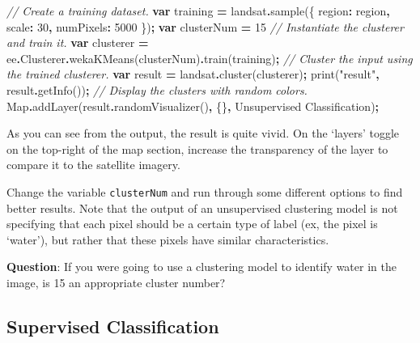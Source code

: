 \documentclass[
]{article}
\newenvironment{Shaded}{\begin{snugshade}}{\end{snugshade}}
\newcommand{\AttributeTok}[1]{\textcolor[rgb]{0.77,0.63,0.00}{#1}}
\newcommand{\BuiltInTok}[1]{#1}
\newcommand{\CommentTok}[1]{\textcolor[rgb]{0.56,0.35,0.01}{\textit{#1}}}
\newcommand{\DataTypeTok}[1]{\textcolor[rgb]{0.13,0.29,0.53}{#1}}
\newcommand{\DecValTok}[1]{\textcolor[rgb]{0.00,0.00,0.81}{#1}}
\newcommand{\FunctionTok}[1]{\textcolor[rgb]{0.00,0.00,0.00}{#1}}
\newcommand{\KeywordTok}[1]{\textcolor[rgb]{0.13,0.29,0.53}{\textbf{#1}}}
\newcommand{\NormalTok}[1]{#1}
\newcommand{\OperatorTok}[1]{\textcolor[rgb]{0.81,0.36,0.00}{\textbf{#1}}}
\newcommand{\StringTok}[1]{\textcolor[rgb]{0.31,0.60,0.02}{#1}}
\begin{document}
\begin{Shaded}
\begin{Highlighting}[]
\CommentTok{// Create a training dataset.}
\KeywordTok{var}\NormalTok{ training }\OperatorTok{=}\NormalTok{ landsat}\OperatorTok{.}\FunctionTok{sample}\NormalTok{(\{}
     \DataTypeTok{region}\OperatorTok{:}\NormalTok{ region}\OperatorTok{,}
     \DataTypeTok{scale}\OperatorTok{:} \DecValTok{30}\OperatorTok{,}
     \DataTypeTok{numPixels}\OperatorTok{:} \DecValTok{5000}
\NormalTok{\})}\OperatorTok{;}
\KeywordTok{var}\NormalTok{ clusterNum }\OperatorTok{=} \DecValTok{15}  
\CommentTok{// Instantiate the clusterer and train it.}
\KeywordTok{var}\NormalTok{ clusterer }\OperatorTok{=}\NormalTok{ ee}\OperatorTok{.}\AttributeTok{Clusterer}\OperatorTok{.}\FunctionTok{wekaKMeans}\NormalTok{(clusterNum)}\OperatorTok{.}\FunctionTok{train}\NormalTok{(training)}\OperatorTok{;}
\CommentTok{// Cluster the input using the trained clusterer.}
\KeywordTok{var}\NormalTok{ result }\OperatorTok{=}\NormalTok{ landsat}\OperatorTok{.}\FunctionTok{cluster}\NormalTok{(clusterer)}\OperatorTok{;}
\FunctionTok{print}\NormalTok{(}\StringTok{"result"}\OperatorTok{,}\NormalTok{ result}\OperatorTok{.}\FunctionTok{getInfo}\NormalTok{())}\OperatorTok{;}
\CommentTok{// Display the clusters with random colors.}
\BuiltInTok{Map}\OperatorTok{.}\FunctionTok{addLayer}\NormalTok{(result}\OperatorTok{.}\FunctionTok{randomVisualizer}\NormalTok{()}\OperatorTok{,}\NormalTok{ \{\}}\OperatorTok{,} \StringTok{\textquotesingle{}Unsupervised Classification\textquotesingle{}}\NormalTok{)}\OperatorTok{;}
\end{Highlighting}
\end{Shaded}

As you can see from the output, the result is quite vivid. On the `layers' toggle on the top-right of the map section, increase the transparency of the layer to compare it to the satellite imagery.

Change the variable \texttt{clusterNum} and run through some different options to find better results. Note that the output of an unsupervised clustering model is not specifying that each pixel should be a certain type of label (ex, the pixel is `water'), but rather that these pixels have similar characteristics.

\textbf{Question}: If you were going to use a clustering model to identify water in the image, is 15 an appropriate cluster number?

\hypertarget{supervised-classification}{%
\subsection{Supervised Classification}\label{supervised-classification}}
\end{document}
